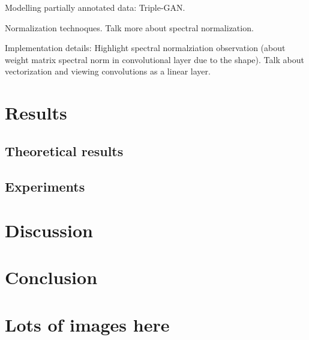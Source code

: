 \documentclass{kththesis}
\begin{document}
Modelling partially annotated data: Triple-GAN.

Normalization technoques. Talk more about spectral normalization. 

Implementation details: Highlight spectral normalziation observation (about weight matrix spectral norm in convolutional layer due to the shape). Talk about vectorization and viewing convolutions as a linear layer. 


\chapter{Results}
\section{Theoretical results}
\section{Experiments}

\chapter{Discussion}

\chapter{Conclusion}


\printbibliography[heading=bibintoc] %

\appendix

\chapter{Lots of images here}
\end{document}
